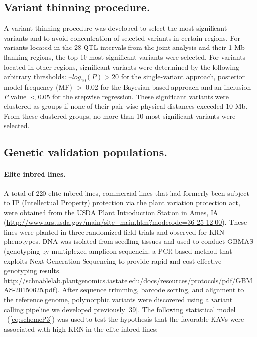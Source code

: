 \documentclass[10pt,letterpaper]{article}
\begin{document}
\subsection*{Variant thinning procedure.}
A variant thinning procedure was developed to select the most significant variants and to avoid concentration of selected variants in certain regions. For variants located in the 28 QTL intervals from the joint analysis and their 1-Mb flanking regions, the top 10 most significant variants were selected. For variants located in other regions, significant variants were determined by the following arbitrary thresholds: $–log_{10}(P) > 20$ for the single-variant approach, posterior model frequency (MF) $>$ 0.02 for the Bayesian-based approach and an inclusion $P$ value $< 0.05$ for the stepwise regression. These significant variants were clustered as groups if none of their pair-wise physical distances exceeded 10-Mb. From these clustered groups, no more than 10 most significant variants were selected.        

\subsection*{Genetic validation populations.} 
\paragraph{Elite inbred lines.}

A total of 220 elite inbred lines, commercial lines that had formerly been subject to IP (Intellectual Property) protection via the plant variation protection act, were obtained from the USDA Plant Introduction Station in Ames, IA (\url{http://www.ars.usda.gov/main/site_main.htm?modecode=36-25-12-00}). These lines were planted in three randomized field trials and observed for KRN phenotypes. DNA was isolated from seedling tissues and used to conduct GBMAS (genotyping-by-multiplexed-amplicon-sequencin. a PCR-based method that exploits Next Generation Sequencing to provide rapid and cost-effective genotyping results. \url{http://schnablelab.plantgenomics.iastate.edu/docs/resources/protocols/pdf/GBMAS-20150625.pdf}). After sequence trimming, barcode sorting, and alignment to the reference genome, polymorphic variants were discovered using a variant calling pipeline we developed previously [39].
%
The following statistical model ~(\ref{eq:schemeP3}) was used to test the hypothesis that the favorable KAVs were associated with high KRN in the elite inbred lines:
\end{document}
